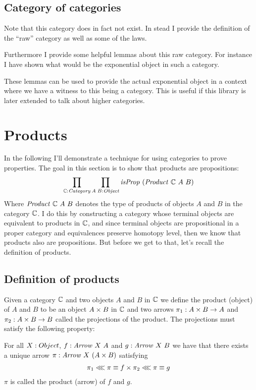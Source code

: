 \subsection{Category of categories}
Note that this category does in fact not exist. In stead I provide the
definition of the ``raw'' category as well as some of the laws.

Furthermore I provide some helpful lemmas about this raw category. For instance
I have shown what would be the exponential object in such a category.

These lemmas can be used to provide the actual exponential object in a context
where we have a witness to this being a category. This is useful if this library
is later extended to talk about higher categories.

\section{Products}
In the following I'll demonstrate a technique for using categories to prove
properties. The goal in this section is to show that products are propositions:
%
$$
\prod_{\mathbb{C} \mathrel{:} \mathit{Category}} \prod_{A\;B \mathrel{:} \mathit{Object}} \mathit{isProp}\ (\mathit{Product}\ \mathbb{C}\ A\ B)
$$
%
Where $\mathit{Product}\ \mathbb{C}\ A\ B$ denotes the type of products of objects $A$
and $B$ in the category $\mathbb{C}$. I do this by constructing a category whose
terminal objects are equivalent to products in $\mathbb{C}$, and since terminal objects
are propositional in a proper category and equivalences preserve homotopy level,
then we know that products also are propositions. But before we get to that,
let's recall the definition of products.

\subsection{Definition of products}
Given a category $\mathbb{C}$ and two objects $A$ and $B$ in $\mathbb{C}$ we define the
product (object) of $A$ and $B$ to be an object $A \times B$ in $\mathbb{C}$ and two arrows
$\pi_1 \mathrel{:} A \times B \to A$ and $\pi_2 \mathrel{:} A \times B \to B$ called the projections of
the product. The projections must satisfy the following property:

For all $X \mathrel{:} Object$, $f \mathrel{:} \mathit{Arrow}\ X\ A$ and $g \mathrel{:} \mathit{Arrow}\ X\ B$ we have
that there exists a unique arrow $\pi \mathrel{:} \mathit{Arrow}\ X\ (A \times B)$ satisfying
%
\begin{align}
\label{eq:umpProduct}
\pi_1 \lll \pi \equiv f \times \pi_2 \lll \pi \equiv g
\end{align}
%
$\pi$ is called the product (arrow) of $f$ and $g$.

